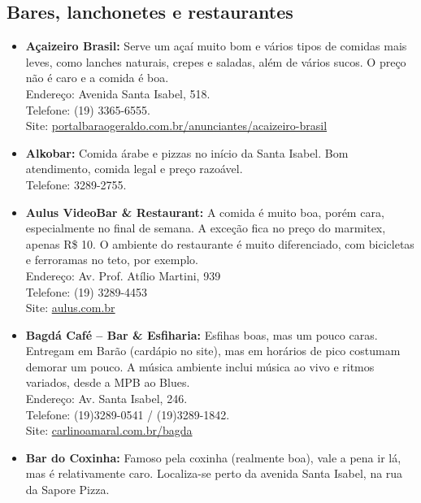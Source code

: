 \subsection{Bares, lanchonetes e restaurantes}
\begin{itemize}
\item   \textbf{Açaizeiro Brasil:} Serve um açaí muito bom e vários tipos de
        comidas mais leves, como lanches naturais, crepes e saladas, além de
        vários sucos. O preço não é caro e a comida é boa.
        \\Endereço: Avenida Santa Isabel, 518.
        \\Telefone: (19) 3365-6555.
        \\Site: \url{portalbaraogeraldo.com.br/anunciantes/acaizeiro-brasil}

\item   \textbf{Alkobar:} Comida árabe e pizzas no início da Santa Isabel. Bom
        atendimento, comida legal e preço razoável.
        \\Telefone: 3289-2755.

\item   \textbf{Aulus VideoBar \& Restaurant:} A comida é muito boa, porém cara,
        especialmente no final de semana. A exceção fica no preço do marmitex,
        apenas R\$ 10. O ambiente do restaurante é muito diferenciado, com
        bicicletas e ferroramas no teto, por exemplo.
		\\Endereço: Av. Prof. Atílio Martini, 939
		\\Telefone: (19) 3289-4453
		\\Site: \url{aulus.com.br}

\item   \textbf{Bagdá Café -- Bar \& Esfiharia:} Esfihas boas, mas um pouco
        caras. Entregam em Barão (cardápio no site), mas em horários de pico
        costumam demorar um pouco. A música ambiente inclui música ao vivo e
        ritmos variados, desde a MPB ao Blues.
        \\Endereço: Av. Santa Isabel, 246.
        \\Telefone: (19)3289-0541 / (19)3289-1842.
        \\Site: \url{carlinoamaral.com.br/bagda}

\item   \textbf{Bar do Coxinha:} Famoso pela coxinha (realmente boa), vale a
        pena ir lá, mas é relativamente caro. Localiza-se perto da avenida Santa
        Isabel, na rua da Sapore Pizza.


\end{itemize}
